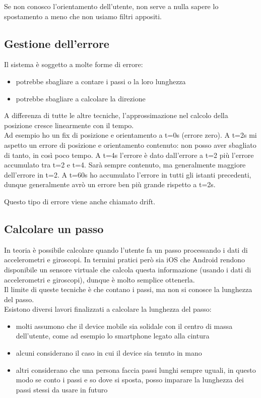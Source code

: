 Se non conosco l'orientamento dell'utente, non serve a nulla sapere lo spostamento a meno che non usiamo filtri appositi.

\subsection{Gestione dell'errore}
Il sistema è soggetto a molte forme di errore:
\begin{itemize}
    \item potrebbe sbagliare a contare i passi o la loro lunghezza
    \item potrebbe sbagliare a calcolare la direzione
\end{itemize}
A differenza di tutte le altre tecniche, l’approssimazione nel calcolo della posizione cresce linearmente con il 
tempo. 
\\ Ad esempio ho un fix di posizione e orientamento a t=0s (errore zero). A t=2s mi aspetto un errore di posizione e orientamento contenuto: non posso aver sbagliato di tanto, in così 
poco tempo. A t=4s l’errore è dato dall’errore a t=2 più l’errore accumulato tra t=2 e t=4. Sarà sempre contenuto, ma 
generalmente maggiore dell’errore in t=2. A t=60s ho accumulato l’errore in tutti gli istanti precedenti, dunque generalmente avrò un errore ben più grande rispetto a t=2s.

Questo tipo di errore viene anche chiamato drift.

\subsection{Calcolare un passo}
In teoria è possibile calcolare quando l'utente fa un passo processando i dati di accelerometri e giroscopi. 
In termini pratici però sia iOS che Android rendono disponibile un sensore virtuale che calcola questa informazione (usando i dati di accelerometri e giroscopi), dunque è molto semplice ottenerla.
\\ Il limite di queste tecniche è che contano i passi, ma non si conosce la lunghezza del passo.
\\ Esistono diversi lavori finalizzati a calcolare la lunghezza del passo:
\begin{itemize}
    \item molti assumono che il device mobile sia solidale con il centro di massa dell'utente, come ad esempio lo smartphone legato alla cintura
    \item alcuni considerano il caso in cui il device sia tenuto in mano
    \item altri considerano che una persona faccia passi lunghi sempre uguali, in questo modo se conto i passi e so dove si sposta, posso imparare la lunghezza dei passi stessi da usare in futuro
\end{itemize}

